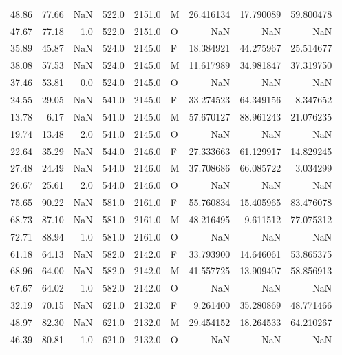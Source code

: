 \begin{table}
\begin{tabular}{rrrrrlrrr}
48.86 &  77.66 &      NaN &  522.0 & 2151.0 &      M & 26.416134 & 17.790089 & 59.800478 \\
47.67 &  77.18 &      1.0 &  522.0 & 2151.0 &      O &       NaN &       NaN &       NaN \\
35.89 &  45.87 &      NaN &  524.0 & 2145.0 &      F & 18.384921 & 44.275967 & 25.514677 \\
38.08 &  57.53 &      NaN &  524.0 & 2145.0 &      M & 11.617989 & 34.981847 & 37.319750 \\
37.46 &  53.81 &      0.0 &  524.0 & 2145.0 &      O &       NaN &       NaN &       NaN \\
24.55 &  29.05 &      NaN &  541.0 & 2145.0 &      F & 33.274523 & 64.349156 &  8.347652 \\
13.78 &   6.17 &      NaN &  541.0 & 2145.0 &      M & 57.670127 & 88.961243 & 21.076235 \\
19.74 &  13.48 &      2.0 &  541.0 & 2145.0 &      O &       NaN &       NaN &       NaN \\
22.64 &  35.29 &      NaN &  544.0 & 2146.0 &      F & 27.333663 & 61.129917 & 14.829245 \\
27.48 &  24.49 &      NaN &  544.0 & 2146.0 &      M & 37.708686 & 66.085722 &  3.034299 \\
26.67 &  25.61 &      2.0 &  544.0 & 2146.0 &      O &       NaN &       NaN &       NaN \\
75.65 &  90.22 &      NaN &  581.0 & 2161.0 &      F & 55.760834 & 15.405965 & 83.476078 \\
68.73 &  87.10 &      NaN &  581.0 & 2161.0 &      M & 48.216495 &  9.611512 & 77.075312 \\
72.71 &  88.94 &      1.0 &  581.0 & 2161.0 &      O &       NaN &       NaN &       NaN \\
61.18 &  64.13 &      NaN &  582.0 & 2142.0 &      F & 33.793900 & 14.646061 & 53.865375 \\
68.96 &  64.00 &      NaN &  582.0 & 2142.0 &      M & 41.557725 & 13.909407 & 58.856913 \\
67.67 &  64.02 &      1.0 &  582.0 & 2142.0 &      O &       NaN &       NaN &       NaN \\
32.19 &  70.15 &      NaN &  621.0 & 2132.0 &      F &  9.261400 & 35.280869 & 48.771466 \\
48.97 &  82.30 &      NaN &  621.0 & 2132.0 &      M & 29.454152 & 18.264533 & 64.210267 \\
46.39 &  80.81 &      1.0 &  621.0 & 2132.0 &      O &       NaN &       NaN &       NaN \\

\end{tabular}
\end{table}
